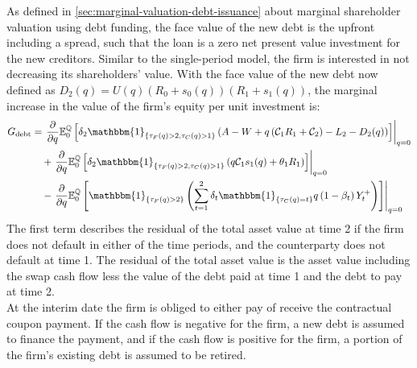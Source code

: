 \documentclass[main.tex]{subfiles}
\begin{document}
        As defined in \cref{sec:marginal-valuation-debt-issuance} about marginal shareholder valuation using debt funding,
        the face value of the new debt is the upfront including a spread, such that the loan is a zero net present value investment for the new creditors.
        Similar to the single-period model, the firm is interested in not decreasing its shareholders' value.
        With the face value of the new debt now defined as $D_{2}(q) = U(q)(R_{0} + s_{0}(q))(R_{1} + s_{1}(q))$,
        the marginal increase in the value of the firm's equity per unit investment is:
        \begin{align}
            G_{\text{debt}} &=
            \left.\frac{\partial}{\partial q}
            \mathbb{E}_{0}^{\rnmeasure}\left[
                \delta_{2} \mathbbm{1}_{\{\tau_{F}(q)>2,\tau_{C}(q)>1\}}
                \left(
                    A - W
                    + q\left(\mathcal{C}_{1} R_{1} + \mathcal{C}_{2}\right)
                    - L_{2}
                    - D_{2}(q)
                \right)
            \right]\right\rvert_{q=0}
            \nonumber
            \\
            &\quad+
            \left.\frac{\partial}{\partial q}
            \mathbb{E}_{0}^{\rnmeasure}\left[
                \delta_2 \mathbbm{1}_{\{\tau_{F}(q)>2,\tau_{C}(q)>1\}}
                \left(q\mathcal{C}_{1} s_1(q) + \theta_{1}R_{1}\right)
            \right]\right\rvert_{q=0}
            \nonumber
            \\
            &\quad-
            \left.\frac{\partial}{\partial q}
            \mathbb{E}_{0}^{\rnmeasure}\left[
                \mathbbm{1}_{\{\tau_{F}(q)>2\}}
                \left(
                    \sum_{t=1}^{2} \delta_{t} \mathbbm{1}_{\{\tau_{C}(q)=t\}}q\left(1-\beta_t\right)Y_{t}^{+}
                \right)
            \right]\right\rvert_{q=0}
        \end{align}
        The first term describes the residual of the total asset value at time 2 if the firm does not default in either of the time periods, and the counterparty does not default at time 1.
        The residual of the total asset value is the asset value including the swap cash flow less the value of the debt paid at time 1 and the debt to pay at time 2.
        \\
        At the interim date the firm is obliged to either pay of receive the contractual coupon payment.
        If the cash flow is negative for the firm, a new debt is assumed to finance the payment,
        and if the cash flow is positive for the firm, a portion of the firm's existing debt is assumed to be retired.
\end{document}
